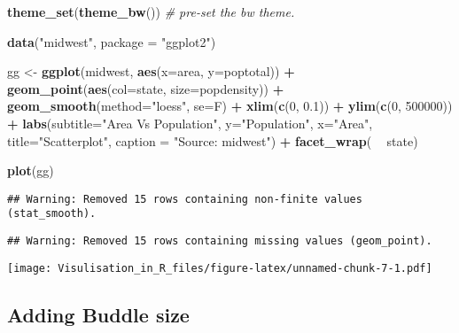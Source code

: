 \documentclass[]{article}
\newenvironment{Shaded}{\begin{snugshade}}{\end{snugshade}}
\newcommand{\KeywordTok}[1]{\textcolor[rgb]{0.13,0.29,0.53}{\textbf{#1}}}
\newcommand{\DataTypeTok}[1]{\textcolor[rgb]{0.13,0.29,0.53}{#1}}
\newcommand{\DecValTok}[1]{\textcolor[rgb]{0.00,0.00,0.81}{#1}}
\newcommand{\FloatTok}[1]{\textcolor[rgb]{0.00,0.00,0.81}{#1}}
\newcommand{\StringTok}[1]{\textcolor[rgb]{0.31,0.60,0.02}{#1}}
\newcommand{\CommentTok}[1]{\textcolor[rgb]{0.56,0.35,0.01}{\textit{#1}}}
\newcommand{\OperatorTok}[1]{\textcolor[rgb]{0.81,0.36,0.00}{\textbf{#1}}}
\newcommand{\NormalTok}[1]{#1}
\begin{document}
\begin{Shaded}
\begin{Highlighting}[]
\KeywordTok{theme_set}\NormalTok{(}\KeywordTok{theme_bw}\NormalTok{())  }\CommentTok{# pre-set the bw theme.}

\KeywordTok{data}\NormalTok{(}\StringTok{"midwest"}\NormalTok{, }\DataTypeTok{package =} \StringTok{"ggplot2"}\NormalTok{)}

\NormalTok{gg <-}\StringTok{ }\KeywordTok{ggplot}\NormalTok{(midwest, }\KeywordTok{aes}\NormalTok{(}\DataTypeTok{x=}\NormalTok{area, }\DataTypeTok{y=}\NormalTok{poptotal)) }\OperatorTok{+}\StringTok{ }
\StringTok{  }\KeywordTok{geom_point}\NormalTok{(}\KeywordTok{aes}\NormalTok{(}\DataTypeTok{col=}\NormalTok{state, }\DataTypeTok{size=}\NormalTok{popdensity)) }\OperatorTok{+}\StringTok{ }
\StringTok{  }\KeywordTok{geom_smooth}\NormalTok{(}\DataTypeTok{method=}\StringTok{"loess"}\NormalTok{, }\DataTypeTok{se=}\NormalTok{F) }\OperatorTok{+}\StringTok{ }
\StringTok{  }\KeywordTok{xlim}\NormalTok{(}\KeywordTok{c}\NormalTok{(}\DecValTok{0}\NormalTok{, }\FloatTok{0.1}\NormalTok{)) }\OperatorTok{+}\StringTok{ }
\StringTok{  }\KeywordTok{ylim}\NormalTok{(}\KeywordTok{c}\NormalTok{(}\DecValTok{0}\NormalTok{, }\DecValTok{500000}\NormalTok{)) }\OperatorTok{+}\StringTok{ }
\StringTok{  }\KeywordTok{labs}\NormalTok{(}\DataTypeTok{subtitle=}\StringTok{"Area Vs Population"}\NormalTok{, }
       \DataTypeTok{y=}\StringTok{"Population"}\NormalTok{, }
       \DataTypeTok{x=}\StringTok{"Area"}\NormalTok{, }
       \DataTypeTok{title=}\StringTok{"Scatterplot"}\NormalTok{, }
       \DataTypeTok{caption =} \StringTok{"Source: midwest"}\NormalTok{) }\OperatorTok{+}\StringTok{ }\KeywordTok{facet_wrap}\NormalTok{( }\OperatorTok{~}\StringTok{ }\NormalTok{state)}


\KeywordTok{plot}\NormalTok{(gg)}
\end{Highlighting}
\end{Shaded}

\begin{verbatim}
## Warning: Removed 15 rows containing non-finite values (stat_smooth).
\end{verbatim}

\begin{verbatim}
## Warning: Removed 15 rows containing missing values (geom_point).
\end{verbatim}

\texttt{[image: Visulisation\_in\_R\_files/figure-latex/unnamed-chunk-7-1.pdf]}

\subsection{Adding Buddle size}\label{adding-buddle-size-1}
\end{document}
